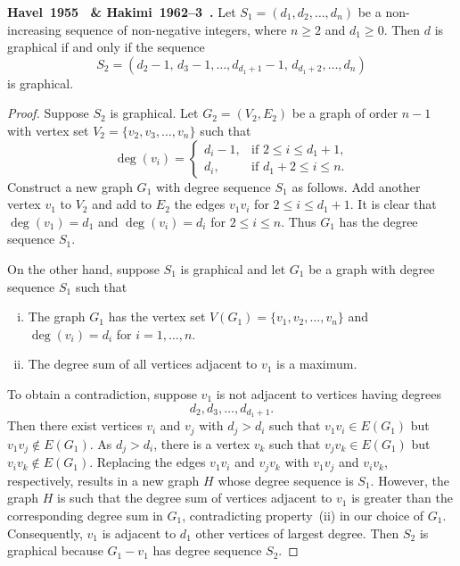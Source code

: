 \begin{theorem}
\label{thm:introduction:Havel1955_Hakimi1962:graphical_sequence}
\textbf{Havel~1955~\cite{Havel1955} \&
  Hakimi~1962--3~\cite{Hakimi1962,Hakimi1963}.}
Let $S_1 = (d_1, d_2, \dots, d_n)$ be a non-increasing sequence of
non-negative integers, where $n \geq 2$ and $d_1 \geq 0$. Then $d$ is
graphical if and only if the sequence
\[
S_2
=
(d_2 - 1,\, d_3 - 1, \dots, d_{d_1 + 1} - 1,\, d_{d_1 + 2}, \dots, d_n)
\]
is graphical.
\end{theorem}

\begin{proof}
Suppose $S_2$ is graphical. Let $G_2 = (V_2, E_2)$ be a graph of order
$n - 1$ with vertex set $V_2 = \{v_2, v_3, \dots, v_n\}$ such that
\[
\deg(v_i)
=
\begin{cases}
d_i - 1, & \text{if $2 \leq i \leq d_1 + 1$,} \\
d_i,     & \text{if $d_1 + 2 \leq i \leq n$.}
\end{cases}
\]
Construct a new graph $G_1$ with degree sequence $S_1$ as follows. Add
another vertex $v_1$ to $V_2$ and add to $E_2$ the edges $v_1 v_i$ for
$2 \leq i \leq d_1 + 1$. It is clear that $\deg(v_1) = d_1$ and
$\deg(v_i) = d_i$ for $2 \leq i \leq n$. Thus $G_1$ has the degree
sequence $S_1$.

On the other hand, suppose $S_1$ is graphical and let $G_1$ be a graph
with degree sequence $S_1$ such that
%
\begin{enumerate}[(i)]
\item The graph $G_1$ has the vertex set
  $V(G_1) = \{v_1, v_2, \dots, v_n\}$ and $\deg(v_i) = d_i$ for
  $i = 1, \dots, n$.

\item The degree sum of all vertices adjacent to $v_1$ is a maximum.
\end{enumerate}
%
To obtain a contradiction, suppose $v_1$ is not adjacent to vertices
having degrees
\[
d_2, d_3, \dots, d_{d_1 + 1}.
\]
Then there exist vertices $v_i$ and $v_j$ with $d_j > d_i$ such that
$v_1 v_i \in E(G_1)$ but $v_1 v_j \not\in E(G_1)$. As $d_j > d_i$,
there is a vertex $v_k$ such that $v_j v_k \in E(G_1)$ but
$v_i v_k \not\in E(G_1)$. Replacing the edges $v_1 v_i$ and $v_j v_k$
with $v_1 v_j$ and $v_i v_k$, respectively, results in a new graph $H$
whose degree sequence is $S_1$. However, the graph $H$ is such that
the degree sum of vertices adjacent to $v_1$ is greater than the
corresponding degree sum in $G_1$, contradicting property~(ii) in our
choice of $G_1$. Consequently, $v_1$ is adjacent to $d_1$ other
vertices of largest degree. Then $S_2$ is graphical because
$G_1 - v_1$ has degree sequence $S_2$.
\end{proof}

